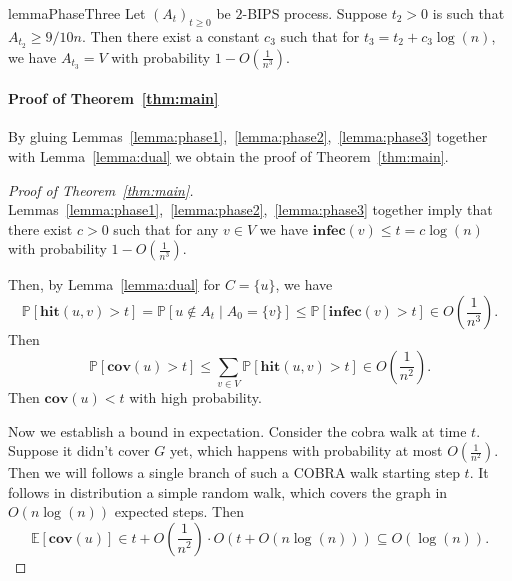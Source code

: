 \documentclass[11pt]{article}
\newcommand{\cov}{\mathbf{cov}}
\newcommand{\hit}{\mathbf{hit}}
\newcommand{\infec}{\mathbf{infec}}
\newcommand{\E}{\mathbb E}
\renewcommand{\Pr}{\mathbb P}
\theoremstyle{remark}
\begin{document}
\begin{restatable}{lemma}{PhaseThree}
    \label{lemma:phase3}
    Let $(A_t)_{t\ge 0}$ be $2$-BIPS process. Suppose $t_2 > 0$ is such that $A_{t_2} \ge 9/10n$. Then there exist a constant $c_3$ such that for $t_3 = t_2 + c_3\log(n)$, we have $A_{t_3} = V$ with probability $1 - O\left(\frac{1}{n^3}\right)$.
\end{restatable}


\paragraph{Proof of Theorem~\ref{thm:main}} By gluing Lemmas~\ref{lemma:phase1},~\ref{lemma:phase2},~\ref{lemma:phase3} together with Lemma~\ref{lemma:dual} we obtain the proof of Theorem~\ref{thm:main}.


\begin{proof}[Proof of Theorem~\ref{thm:main}]
    Lemmas~\ref{lemma:phase1},~\ref{lemma:phase2},~\ref{lemma:phase3} together imply that there exist $c > 0$ such that for any $v\in V$ we have $\infec(v) \le t =  c\log(n)$ with probability $1 - O\left(\frac{1}{n^3}\right)$. 

    Then, by Lemma~\ref{lemma:dual} for $C = \{u\}$, we have 
    \[
    \Pr\left[\hit(u,v) > t \right] = \Pr\left[u \not \in A_t \mid A_0 = \{v\} \right] \le \Pr\left[\infec(v) > t\right] \in O\left(\frac{1}{n^3}\right).
    \]
    Then
    \[
    \Pr[\cov(u) > t] \le \sum_{v\in V} \Pr\left[\hit(u,v) > t \right] \in O\left(\frac{1}{n^2}\right).
    \]
    Then $\cov(u) < t$ with high probability. 

    Now we establish a bound in expectation. Consider the cobra walk at time $t$. Suppose it didn't cover $G$ yet, which happens with probability at most $O\left(\frac{1}{n^2}\right)$. Then we will follows a single branch of such a COBRA walk starting step $t$. It follows in distribution a simple random walk, which covers the graph in $O(n\log(n))$ expected steps. Then
    \[
    \E\left[\cov(u)\right] \in t + O\left(\frac{1}{n^2}\right) \cdot O(t + O(n\log(n))) \subseteq O(\log(n)).
    \]
\end{proof}

\printbibliography


\end{document}
